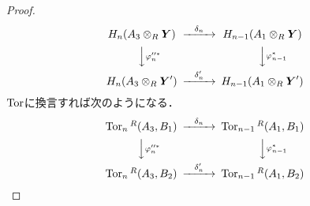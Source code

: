 \begin{proof}
  \[
  \begin{CD}
    H_n(A_3 \otimes_R \boldsymbol{Y}) @>{\delta_n}>> H_{n-1}(A_1 \otimes_R \boldsymbol{Y}) \\
    @VV{\varphi_n''^\ast}V @VV{\varphi_{n-1}^\ast}V \\
    H_n(A_3 \otimes_R \boldsymbol{Y}') @>{\delta_n'}>> H_{n-1}(A_1 \otimes_R \boldsymbol{Y}')
  \end{CD}
  \]
  $\operatorname{Tor}$に換言すれば次のようになる．
  \[
  \begin{CD}
    \Tor_n{}^R (A_3, B_1) @>{\delta_n}>> \Tor_{n-1}{}^R (A_1, B_1) \\
    @VV{\varphi_n''^\ast}V @VV{\varphi_{n-1}^\ast}V \\
    \Tor_n{}^R(A_3, B_2) @>{\delta_n'}>> \Tor_{n-1}{}^R (A_1, B_2)
  \end{CD}
  \]
\end{proof}

